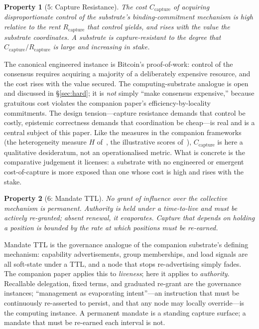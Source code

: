 \documentclass[11pt]{article}
\theoremstyle{definition}
\theoremstyle{plain}
\newtheorem*{property}{Property}
\begin{document}
\begin{property}[5: Capture Resistance]
The cost $C_{\text{capture}}$ of acquiring disproportionate control of the
substrate's binding-commitment mechanism is high relative to the rent
$R_{\text{capture}}$ that control yields, and rises with the value the substrate
coordinates. A substrate is capture-resistant to the degree that
$C_{\text{capture}} / R_{\text{capture}}$ is large and increasing in stake.
\end{property}

The canonical engineered instance is Bitcoin's proof-of-work: control of the
consensus requires acquiring a majority of a deliberately expensive resource, and
the cost rises with the value secured. The computing-substrate analogue is open
and discussed in \S\ref{sec:hard}; it is \emph{not} simply ``make consensus
expensive,'' because gratuitous cost violates the companion paper's
efficiency-by-locality commitments. The design tension---capture resistance
demands that control be costly, epistemic correctness demands that coordination be
cheap---is real and is a central subject of this paper. Like the measures in the
companion frameworks (the heterogeneity measure $H$ of~\cite{nicholson2026hlks}, the
illustrative scores of~\cite{nicholson2025}), $C_{\text{capture}}$ is here a
qualitative desideratum, not an operationalised metric. What is concrete is the
comparative judgement it licenses: a substrate with no engineered or emergent
cost-of-capture is more exposed than one whose cost is high and rises with the stake.

\begin{property}[6: Mandate TTL]
No grant of influence over the collective mechanism is permanent. Authority is
held under a time-to-live and must be actively re-granted; absent renewal, it
evaporates. Capture that depends on holding a position is bounded by the rate at
which positions must be re-earned.
\end{property}

Mandate TTL is the governance analogue of the companion substrate's defining
mechanism: capability advertisements, group memberships, and load signals are all
soft-state under a TTL, and a node that stops re-advertising simply fades. The
companion paper applies this to \emph{liveness}; here it applies to
\emph{authority}. Recallable delegation, fixed terms, and graduated re-grant are
the governance instances; ``management as evaporating intent''---an instruction
that must be continuously re-asserted to persist, and that any node may locally
override---is the computing instance. A permanent mandate is a standing capture
surface; a mandate that must be re-earned each interval is not.
\end{document}
